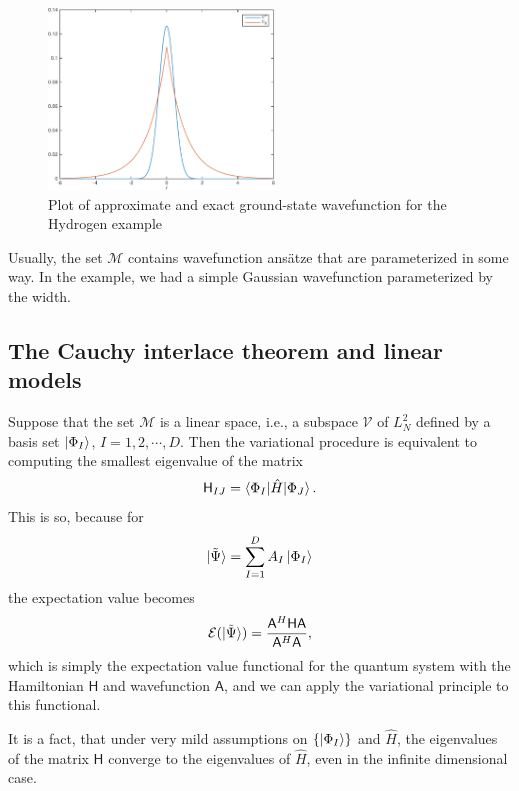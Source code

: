 \documentclass{report}
\theoremstyle{plain}
\theoremstyle{definition}
\begin{document}
\begin{figure}
  \begin{center}
    \includegraphics[width=6cm]{hydrogen-gaussian-crop.pdf}
  \end{center}
  \caption{Plot of approximate and exact ground-state wavefunction for
    the Hydrogen example\label{fig:hydrogen}}
\end{figure}

Usually, the set $\mathcal{M}$ contains wavefunction ans\"atze that
are parameterized in some way. In the example, we had a simple
Gaussian wavefunction parameterized by the width. 




\subsection{The Cauchy interlace theorem and linear models}

Suppose that the set $\mathcal{M}$ is a linear space, i.e., a subspace $\mathcal{V}$
of $L^2_N$ defined by a basis set $\ket{\Phi_I}$, $I = 1, 2, \cdots,
D$. Then the variational procedure is equivalent to computing the
smallest eigenvalue of the matrix
\begin{equation}
  \mathsf{H}_{IJ} = \braket{\Phi_I|\hat{H}|\Phi_J}.
\end{equation}
This is so, because for
\begin{equation}
  \ket{\tilde{\Psi}} = \sum_{I=1}^D A_I \ket{\Phi_I}
\end{equation}
the expectation value becomes
\begin{equation}
  \mathcal{E}(\ket{\tilde{\Psi}}) = \frac{ \mathsf{A}^H \mathsf{H}
    \mathsf{A}}{\mathsf{A}^H \mathsf{A}}, \label{eq:matrix-expt}
\end{equation}
which is simply the expectation value functional for the quantum
system with the Hamiltonian $\mathsf{H}$ and wavefunction
$\mathsf{A}$, and we can apply the variational principle to this functional.


It is a fact, that under very mild assumptions on $\{\ket{\Phi_I}\}$
and $\hat{H}$, the eigenvalues of the matrix $\mathsf{H}$ converge
to the eigenvalues of $\hat{H}$, even in the infinite dimensional
case.
\end{document}
